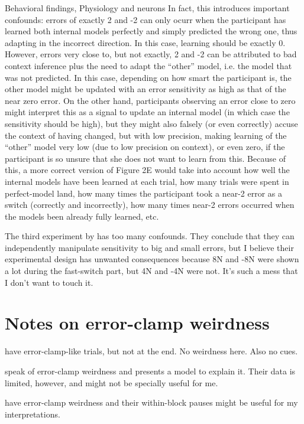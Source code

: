 \documentclass{report}
\begin{document}
\begin{chapter}{Behavioral findings, Physiology and neurons}
In fact, this introduces important confounds: errors of exactly 2 and -2 can
only ocurr when the participant has learned both internal models perfectly and
simply predicted the wrong one, thus adapting in the incorrect direction. In
this case, learning should be exactly 0. However, errors very close to, but not
exactly, 2 and -2 can be attributed to bad context inference plus the need to
adapt the ``other'' model, i.e. the model that was not predicted. In this case,
depending on how smart the participant is, the other model might be updated
with an error sensitivity as high as that of the near zero error. On the other
hand, participants observing an error close to zero might interpret this as a
signal to update an internal model (in which case the sensitivity should be
high), but they might also falsely (or even correctly) accuse the context of
having changed, but with low precision, making learning of the ``other'' model
very low (due to low precision on context), or even zero, if the participant is
so unsure that she does not want to learn from this. Because of this, a more
correct version of Figure 2E would take into account how well the internal
models have been learned at each trial, how many trials were spent in
perfect-model land, how many times the participant took a near-2 error as a
switch (correctly and incorrectly), how many times near-2 errors occurred when
the models been already fully learned, etc.

The third experiment by \cite{Herzfeld_memory_2014} has too many
confounds. They conclude that they can independently manipulate sensitivity to
big and small errors, but I believe their experimental design has unwanted
consequences because 8N and -8N were shown a lot during the fast-switch part,
but 4N and -4N were not. It's such a mess that I don't want to touch it.



\section{Notes on error-clamp weirdness}
\cite{Kojima_Memory_2004} have error-clamp-like trials, but not at the end. No
weirdness here. Also no cues.

\cite{Smith_Interacting_2006} speak of error-clamp weirdness and presents a
model to explain it. Their data is limited, however, and might not be specially
useful for me.

\cite{Ethier_Spontaneous_2008} have error-clamp weirdness and their
within-block pauses might be useful for my interpretations.
\end{chapter}
\end{document}
